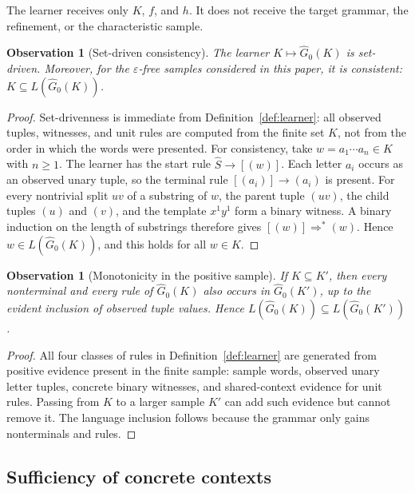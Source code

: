 \documentclass[11pt,a4paper]{article}
\newtheorem{observation}[theorem]{Observation}
\theoremstyle{remark}
\newcommand{\eps}{\varepsilon}
\begin{document}
The learner receives only \(K\), \(f\), and \(h\).  It does not receive the
target grammar, the refinement, or the characteristic sample.


\begin{observation}[Set-driven consistency]
\label{obs:set-driven-consistent}
The learner $K\mapsto\widehat G_0(K)$ is set-driven.  Moreover, for the
$\eps$-free samples considered in this paper, it is consistent:
$K\subseteq L(\widehat G_0(K))$.
\end{observation}

\begin{proof}
Set-drivenness is immediate from Definition~\ref{def:learner}: all observed
tuples, witnesses, and unit rules are computed from the finite set $K$, not
from the order in which the words were presented.  For consistency, take
$w=a_1\cdots a_n\in K$ with $n\ge1$.  The learner has the start rule
$\widehat S\to[(w)]$.  Each letter $a_i$ occurs as an observed unary tuple, so
the terminal rule $[(a_i)]\to(a_i)$ is present.  For every nontrivial split
$uv$ of a substring of $w$, the parent tuple $(uv)$, the child tuples $(u)$ and
$(v)$, and the template $x^1y^1$ form a binary witness.  A binary induction on
the length of substrings therefore gives $[(w)]\Rightarrow^*(w)$.  Hence
$w\in L(\widehat G_0(K))$, and this holds for all $w\in K$.
\end{proof}

\begin{observation}[Monotonicity in the positive sample]
\label{obs:learner-monotone}
If \(K\subseteq K'\), then every nonterminal and every rule of
\(\widehat G_0(K)\) also occurs in \(\widehat G_0(K')\), up to the evident
inclusion of observed tuple values.  Hence
\(L(\widehat G_0(K))\subseteq L(\widehat G_0(K'))\).
\end{observation}

\begin{proof}
All four classes of rules in Definition~\ref{def:learner} are generated from
positive evidence present in the finite sample: sample words, observed unary
letter tuples, concrete binary witnesses, and shared-context evidence for unit
rules.  Passing from \(K\) to a larger sample \(K'\) can add such evidence but
cannot remove it.  The language inclusion follows because the grammar only gains
nonterminals and rules.
\end{proof}


\subsection{Sufficiency of concrete contexts}
\end{document}
